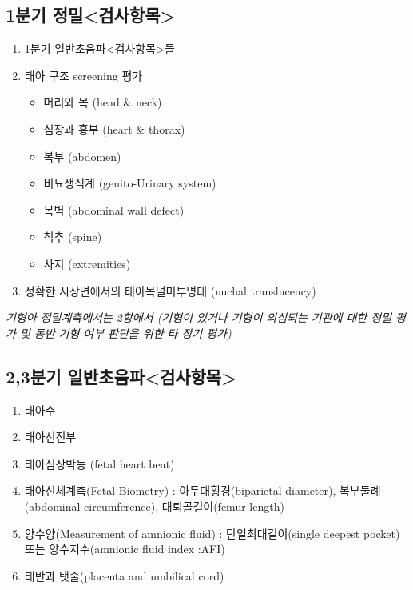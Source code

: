 \subsection{1분기 정밀<검사항목>}
\begin{enumerate}[①]\tightlist
\item 1분기 일반초음파<검사항목>들
\item 태아 구조 screening 평가
	\begin{itemize}[-]\tightlist
	\item 머리와 목 (head \& neck)
	\item 심장과 흉부 (heart \& thorax)
	\item 복부 (abdomen)
	\item 비뇨생식계 (genito-Urinary system)
	\item 복벽 (abdominal wall defect)
	\item 척추 (spine)
	\item 사지 (extremities)
	\end{itemize}
\item 정확한 시상면에서의 태아목덜미투명대 (nuchal translucency)
\end{enumerate}
\emph{기형아 정밀계측에서는 2항에서 (기형이 있거나 기형이 의심되는 기관에 대한 정밀 평가 및 동반 기형 여부 판단을 위한 타 장기 평가)}
\prezi{\clearpage}
\subsection{2,3분기 일반초음파<검사항목>}
\begin{enumerate}[①]\tightlist
\item 태아수
\item 태아선진부
\item 태아심장박동 (fetal heart beat)
\item 태아신체계측(Fetal Biometry) : 아두대횡경(biparietal diameter), 복부둘례(abdominal circumference), 대퇴골길이(femur length)
\item 양수양(Measurement of amnionic fluid) : 단일최대길이(single deepest pocket) 또는 양수지수(amnionic fluid index :AFI)
\item 태반과 탯줄(placenta and umbilical cord)
\end{enumerate}
\prezi{\clearpage}
